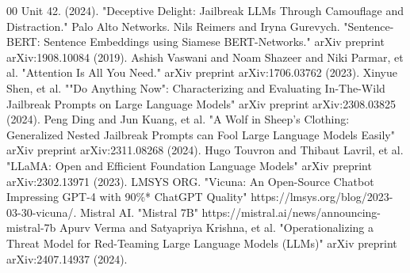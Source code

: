 \documentclass[conference]{IEEEtran}
\begin{document}
\begin{thebibliography}{00}
 Unit 42. (2024). "Deceptive Delight: Jailbreak LLMs Through Camouflage and Distraction." Palo Alto Networks.
 Nils Reimers and Iryna Gurevych. "Sentence-BERT: Sentence Embeddings using Siamese BERT-Networks." arXiv preprint arXiv:1908.10084 (2019).
 Ashish Vaswani and Noam Shazeer and Niki Parmar, et al. "Attention Is All You Need."  arXiv preprint arXiv:1706.03762 (2023).
 Xinyue Shen, et al. ""Do Anything Now": Characterizing and Evaluating In-The-Wild Jailbreak Prompts on Large Language Models" arXiv preprint arXiv:2308.03825 (2024).
 Peng Ding and Jun Kuang, et al. "A Wolf in Sheep's Clothing: Generalized Nested Jailbreak Prompts can Fool Large Language Models Easily" arXiv preprint arXiv:2311.08268 (2024).
 Hugo Touvron and Thibaut Lavril, et al. "LLaMA: Open and Efficient Foundation Language Models" arXiv preprint arXiv:2302.13971 (2023).
 LMSYS ORG. "Vicuna: An Open-Source Chatbot Impressing GPT-4 with 90\%* ChatGPT Quality" https://lmsys.org/blog/2023-03-30-vicuna/.
 Mistral AI. "Mistral 7B" https://mistral.ai/news/announcing-mistral-7b
 Apurv Verma and Satyapriya Krishna, et al. "Operationalizing a Threat Model for Red-Teaming Large Language Models (LLMs)" arXiv preprint arXiv:2407.14937 (2024).
\end{thebibliography}
\end{document}
